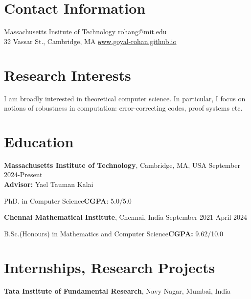 \documentclass[margin,line, 10pt]{res}
\begin{document}

\begin{resume}
\section{\sc Contact Information}
Massachusetts Insitute of Technology \hfill {rohan\textunderscore g@mit.edu}\\
32 Vassar St., Cambridge, MA \hfill \href{https://goyal-rohan.github.io/}{\texttt www.goyal-rohan.github.io}

\section{\sc Research Interests}
I am broadly interested in theoretical computer science. In particular, I focus on notions of robustness in computation: error-correcting codes, proof systems etc.
\section{\sc Education}


{\bf Massachusetts Institute of Technology}, Cambridge, MA, USA \hfill September 2024-Present\\
{\bf Advisor:} Yael Tauman Kalai

\vspace{-0.4cm}
PhD. in Computer Science\hfill {\bf CGPA}: 5.0/5.0



{\bf Chennai Mathematical Institute}, Chennai, India \hfill September 2021-April 2024

\vspace{-0.4cm}
B.Sc.(Honours) in Mathematics and Computer Science{\hfill{\bf CGPA:} 9.62/10.0}




\section{\sc Internships, Research Projects}
{\bf Tata Institute of Fundamental Research}, Navy Nagar, Mumbai, India


\end{resume}
\end{document}

